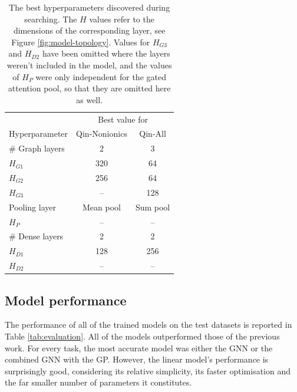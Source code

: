 \begin{table}
    \centering
    \caption{The best hyperparameters discovered during searching. The $H$
        values refer to the dimensions of the corresponding layer, see Figure
        \ref{fig:model-topology}. Values for $H_{G3}$ and $H_{D2}$ have been
        omitted where the layers weren't included in the model, and the values
        of $H_P$ were only independent for the gated attention pool, so that
        they are omitted here as well.}
    \label{tab:hb-hps}
    \begin{tabular}{@{}lcc@{}} \toprule
                        & \multicolumn{2}{c}{Best value for}            \\\cmidrule(l){2-3}
        Hyperparameter  & Qin-Nonionics                      & Qin-All  \\\midrule
        \# Graph layers & 2                                  & 3        \\
        $H_{G1}$        & 320                                & 64       \\
        $H_{G2}$        & 256                                & 64       \\
        $H_{G3}$        & --                                 & 128      \\
        Pooling layer   & Mean pool                          & Sum pool \\
        $H_P$           & --                                 & --       \\
        \# Dense layers & 2                                  & 2        \\
        $H_{D1}$        & 128                                & 256      \\
        $H_{D2}$        & --                                 & --       \\\bottomrule
    \end{tabular}
\end{table}

\subsection{Model performance}

The performance of all of the trained models on the test datasets is reported in
Table \ref{tab:evaluation}. All of the models outperformed those of the previous
work. For every task, the most accurate model was either the GNN or the combined
GNN with the GP. However, the linear model's performance is surprisingly good,
considering its relative simplicity, its faster optimisation and the far smaller
number of parameters it constitutes.

